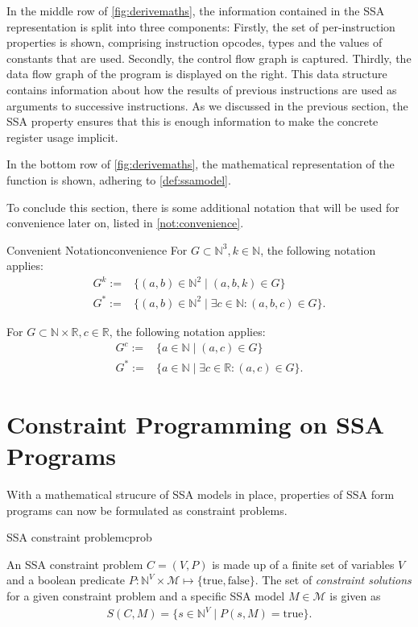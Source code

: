     In the middle row of \autoref{fig:derivemaths}, the information contained in
    the SSA representation is split into three components:
    Firstly, the set of per-instruction properties is shown, comprising
    instruction opcodes, types and the values of constants that are used.
    Secondly, the control flow graph is captured.
    Thirdly, the data flow graph of the program is displayed on the right.
    This data structure contains information about how the results of previous
    instructions are used as arguments to successive instructions.
    As we discussed in the previous section, the SSA property ensures that this
    is enough information to make the concrete register usage implicit.

    In the bottom row of \autoref{fig:derivemaths}, the mathematical
    representation of the function is shown, adhering to \autoref{def:ssamodel}.

    To conclude this section, there is some additional notation that will be
    used for convenience later on, listed in \autoref{not:convenience}.

\begin{notation}{Convenient Notation}{convenience}
    For $G\subset\mathbb N^3, k\in\mathbb N$, the following notation applies:
    \begin{align*}
        G^k:=&\{(a,b)\in\mathbb N^2\mid (a,b,k)\in G\}\\
        G^*:=&\{(a,b)\in\mathbb N^2\mid \exists c\in\mathbb N:(a,b,c)\in G\}.
    \end{align*}

    For $G\subset\mathbb N\times\mathbb R, c\in\mathbb R$, the following
    notation applies:
    \begin{align*}
        G^c:=&\{a\in\mathbb N\mid (a,c)\in G\}\\
        G^*:=&\{a\in\mathbb N\mid \exists c\in\mathbb R:(a,c)\in G\}.
    \end{align*}
\end{notation}

\section{Constraint Programming on SSA Programs}

    With a mathematical strucure of SSA models in place, properties of SSA form
    programs can now be formulated as constraint problems.

\begin{definition}{SSA constraint problem}{cprob}

    An SSA constraint problem $C=(V,P)$ is made up of a finite set of variables
    $V$ and a boolean predicate
    $P\colon\mathbb N^V\times\mathcal M\mapsto\{\text{true}, \text{false}\}$.
    The set of {\em constraint solutions} for a given constraint problem and a
    specific SSA model $M\in\mathcal M$ is given as
    \begin{align*}
        S(C,M) = \{s\in\mathbb N^V\mid P(s,M)=\text{true}\}.
    \end{align*}
\end{definition}

